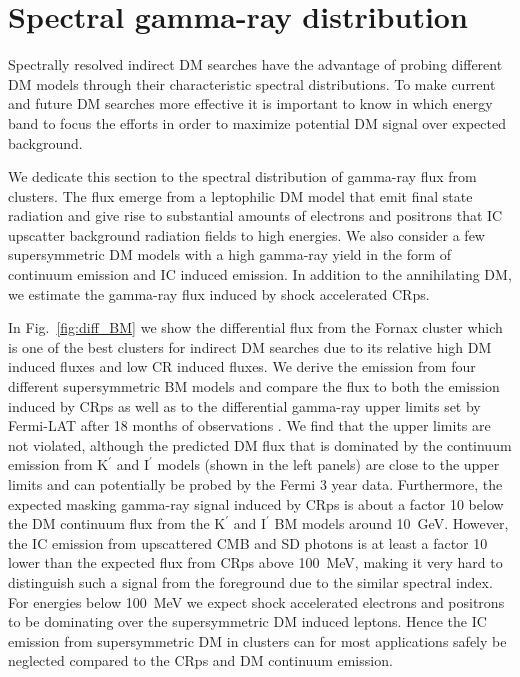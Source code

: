 \documentclass[10pt,aps,pra,reprint,amsmath,amsfonts,amssymb,showpacs]{revtex4-1}
\newcommand{\rmn}{\mathrm}
\newcommand{\Kp}{\rmn{K}^\prime}
\newcommand{\Ip}{\rmn{I}^\prime}
\begin{document}
\section{Spectral gamma-ray distribution}
\label{sect:spectral}
Spectrally resolved indirect DM searches have the advantage of probing
different DM models through their characteristic spectral
distributions. To make current and future DM searches more effective
it is important to know in which energy band to focus the efforts in
order to maximize potential DM signal over expected background.

We dedicate this section to the spectral distribution of gamma-ray
flux from clusters. The flux emerge from a leptophilic DM model that
emit final state radiation and give rise to substantial amounts of
electrons and positrons that IC upscatter background radiation fields
to high energies. We also consider a few supersymmetric DM models with
a high gamma-ray yield in the form of continuum emission and IC
induced emission. In addition to the annihilating DM, we estimate the
gamma-ray flux induced by shock accelerated CRps.

In Fig.~\ref{fig:diff_BM} we show the differential flux from the
Fornax cluster which is one of the best clusters for indirect DM
searches due to its relative high DM induced fluxes and low CR induced
fluxes. We derive the emission from four different supersymmetric BM
models and compare the flux to both the emission induced by CRps as
well as to the differential gamma-ray upper limits set by Fermi-LAT
after 18 months of observations \cite{2010ApJ...717L..71A}. We find
that the upper limits are not violated, although the predicted DM flux
that is dominated by the continuum emission from $\Kp$ and $\Ip$
models (shown in the left panels) are close to the upper limits and
can potentially be probed by the Fermi 3 year data. Furthermore, the
expected masking gamma-ray signal induced by CRps is about a factor 10
below the DM continuum flux from the $\Kp$ and $\Ip$ BM models around
10~GeV. However, the IC emission from upscattered CMB and SD photons
is at least a factor 10 lower than the expected flux from CRps above
100~MeV, making it very hard to distinguish such a signal from the
foreground due to the similar spectral index. For energies below
100~MeV we expect shock accelerated electrons and positrons to be
dominating \cite{2010MNRAS.409..449P} over the supersymmetric DM
induced leptons. Hence the IC emission from supersymmetric DM in
clusters can for most applications safely be neglected compared to the
CRps and DM continuum emission.
\end{document}
